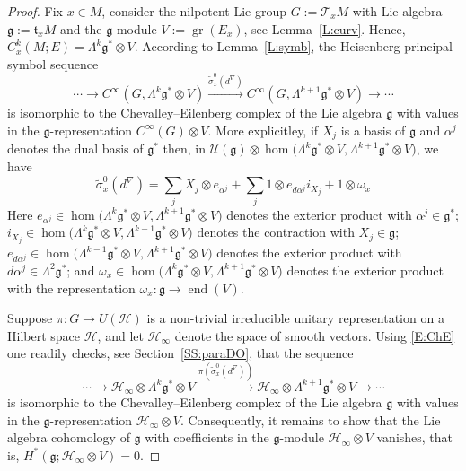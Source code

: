 \documentclass[reqno,12pt]{amsart}
\DeclareMathOperator{\gr}{gr}
\newcommand\goe{\mathfrak g}
\DeclareMathOperator{\eend}{end}
\theoremstyle{plain}
\theoremstyle{definition}
\begin{document}
\begin{proof}
Fix $x\in M$, consider the nilpotent Lie group $G:=\mathcal T_xM$ with Lie algebra $\goe:=\mathfrak t_xM$ and the $\goe$-module $V:=\gr(E_x)$, see Lemma~\ref{L:curv}.
Hence, $C_x^k(M;E)=\Lambda^k\goe^*\otimes V$.
According to Lemma~\ref{L:symb}, the Heisenberg principal symbol sequence
$$
\cdots\to C^\infty(G,\Lambda^k\goe^*\otimes V)\xrightarrow{\tilde\sigma_x^0(d^\nabla)}
C^\infty(G,\Lambda^{k+1}\goe^*\otimes V)\to\cdots
$$
is isomorphic to the Chevalley--Eilenberg complex of the Lie algebra $\goe$ with values in the $\goe$-representation $C^\infty(G)\otimes V$.
More explicitley, if $X_j$ is a basis of $\goe$ and $\alpha^j$ denotes the dual basis of $\goe^*$ then, in $\mathcal U(\goe)\otimes\hom\bigl(\Lambda^k\goe^*\otimes V,\Lambda^{k+1}\goe^*\otimes V\bigr)$, we have
\begin{equation}\label{E:ChE}
\tilde\sigma_x^0(d^\nabla)=\sum_jX_j\otimes e_{\alpha^j}+\sum_j1\otimes e_{d\alpha^j}i_{X_j}+1\otimes\omega_x
\end{equation}
Here $e_{\alpha^j}\in\hom\bigl(\Lambda^k\goe^*\otimes V,\Lambda^{k+1}\goe^*\otimes V\bigr)$ denotes the exterior product with $\alpha^j\in\goe^*$; $i_{X_j}\in\hom\bigl(\Lambda^k\goe^*\otimes V,\Lambda^{k-1}\goe^*\otimes V\bigr)$ denotes the contraction with $X_j\in\goe$; $e_{d\alpha^j}\in\hom\bigl(\Lambda^{k-1}\goe^*\otimes V,\Lambda^{k+1}\goe^*\otimes V\bigr)$ denotes the exterior product with $d\alpha^j\in\Lambda^2\goe^*$; and $\omega_x\in\hom\bigl(\Lambda^k\goe^*\otimes V,\Lambda^{k+1}\goe^*\otimes V\bigr)$ denotes the exterior product with the representation $\omega_x\colon\goe\to\eend(V)$.

Suppose $\pi\colon G\to U(\mathcal H)$ is a non-trivial irreducible unitary representation on a Hilbert space $\mathcal H$, and let $\mathcal H_\infty$ denote the space of smooth vectors.
Using \eqref{E:ChE} one readily checks, see Section~\ref{SS:paraDO}, that the sequence
\begin{equation*}\label{E:tbse}
\cdots\to\mathcal H_\infty\otimes\Lambda^k\goe^*\otimes V\xrightarrow{\pi(\tilde\sigma^0_x(d^\nabla))}\mathcal H_\infty\otimes\Lambda^{k+1}\goe^*\otimes V\to\cdots
\end{equation*}
is isomorphic to the Chevalley--Eilenberg complex of the Lie algebra $\goe$ with values in the $\goe$-representation $\mathcal H_\infty\otimes V$.
Consequently, it remains to show that the Lie algebra cohomology of $\goe$ with coefficients in the $\goe$-module $\mathcal H_\infty\otimes V$ vanishes, that is, $H^*(\goe;\mathcal H_\infty\otimes V)=0$.



\end{proof}
\end{document}
